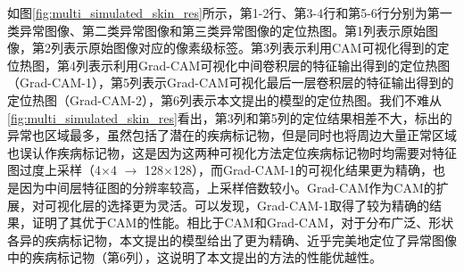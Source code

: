 如图\ref{fig:multi_simulated_skin_res}所示，第1-2行、第3-4行和第5-6行分别为第一类异常图像、第二类异常图像和第三类异常图像的定位热图。第1列表示原始图像，第2列表示原始图像对应的像素级标签。第3列表示利用CAM可视化得到的定位热图，第4列表示利用Grad-CAM可视化中间卷积层的特征输出得到的定位热图（Grad-CAM-1），第5列表示Grad-CAM可视化最后一层卷积层的特征输出得到的定位热图（Grad-CAM-2），第6列表示本文提出的模型的定位热图。我们不难从\ref{fig:multi_simulated_skin_res}看出，第3列和第5列的定位结果相差不大，标出的异常也区域最多，虽然包括了潜在的疾病标记物，但是同时也将周边大量正常区域也误认作疾病标记物，这是因为这两种可视化方法定位疾病标记物时均需要对特征图过度上采样（4$\times$4 $\rightarrow$ 128$\times$128），而Grad-CAM-1的可视化结果更为精确，也是因为中间层特征图的分辨率较高，上采样倍数较小。Grad-CAM作为CAM的扩展，对可视化层的选择更为灵活。可以发现，Grad-CAM-1取得了较为精确的结果，证明了其优于CAM的性能。相比于CAM和Grad-CAM，对于分布广泛、形状各异的疾病标记物，本文提出的模型给出了更为精确、近乎完美地定位了异常图像中的疾病标记物（第6列），这说明了本文提出的方法的性能优越性。

